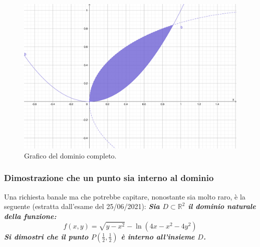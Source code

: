 \documentclass[a4paper]{article}
\begin{document}
	\begin{figure}[!htp]
		\centering
		\includegraphics[width=\textwidth]{img/grafico-ex3-3.pdf}
		\caption*{Grafico del dominio completo.}
	\end{figure}\newpage

	\subsubsection{Dimostrazione che un punto sia interno al dominio}

	Una richiesta banale ma che potrebbe capitare, nonostante sia molto raro, è la seguente (estratta dall'esame del 25/06/2021): \textcolor{Green4}{\textbf{\emph{Sia $D\subset\mathbb{R}^{2}$ il dominio naturale della funzione:}}
	\begin{equation*}
		f\left(x,y\right) = \sqrt{y-x^{2}}-\ln\left(4x-x^{2}-4y^{2}\right)
	\end{equation*}
	\textbf{\emph{Si dimostri che il punto $P\left(\frac{1}{2}, \frac{1}{2}\right)$ è interno all'insieme $D$.}}}\newline
\end{document}
